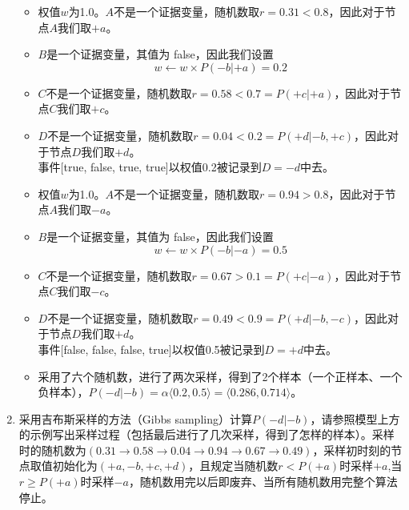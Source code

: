 \begin{enumerate}
    \begin{solution}
        \begin{itemize}
            \item 权值$w$为1.0。$A$不是一个证据变量，随机数取$r=0.31<0.8$，因此对于节点$A$我们取$+a$。
            \item $B$是一个证据变量，其值为 false，因此我们设置
            \begin{equation*}
                w\leftarrow w\times P(-b|+a) = 0.2
            \end{equation*}
            \item $C$不是一个证据变量，随机数取$r=0.58<0.7=P(+c|+a)$，因此对于节点$C$我们取$+c$。
            \item $D$不是一个证据变量，随机数取$r=0.04<0.2=P(+d| -b,+c)$，因此对于节点$D$我们取$+d$。\\
            事件[true, false, true, true]以权值0.2被记录到$D=-d$中去。
            \item 权值$w$为1.0。$A$不是一个证据变量，随机数取$r=0.94>0.8$，因此对于节点$A$我们取$-a$。
            \item $B$是一个证据变量，其值为 false，因此我们设置
            \begin{equation*}
                w\leftarrow w\times P(-b|-a) = 0.5
            \end{equation*}
            \item $C$不是一个证据变量，随机数取$r=0.67>0.1=P(+c|-a)$，因此对于节点$C$我们取$-c$。
            \item $D$不是一个证据变量，随机数取$r=0.49<0.9=P(+d| -b,-c)$，因此对于节点$D$我们取$+d$。\\
            事件[false, false, false, true]以权值0.5被记录到$D=+d$中去。
            \item 采用了六个随机数，进行了两次采样，得到了2个样本（一个正样本、一个负样本），$P(-d|-b)=\alpha\langle0.2,0.5\rangle=\langle 0.286, 0.714\rangle$。
        \end{itemize}
    \end{solution}
    \item 采用吉布斯采样的方法（Gibbs sampling）计算$P(-d|-b)$，请参照模型上方的示例写出采样过程（包括最后进行了几次采样，得到了怎样的样本）。采样时的随机数为$(0.31\rightarrow 0.58\rightarrow 0.04 \rightarrow 0.94 \rightarrow 0.67 \rightarrow 0.49)$，采样初时刻的节点取值初始化为$(+a, -b, +c, +d)$，且规定当随机数$r<P(+a)$时采样$+a$,当$r\geq P(+a)$时采样$-a$，随机数用完以后即废弃、当所有随机数用完整个算法停止。
    \begin{solution}

\end{solution}
\end{enumerate}
